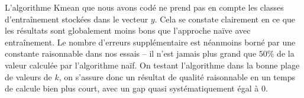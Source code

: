 \documentclass{article}
\begin{document}
L'algorithme Kmean que nous avons codé ne prend pas en compte les classes d'entraînement stockées dans le vecteur $y$. Cela se constate clairement en ce que les résultats sont globalement moins bons que l'approche naïve avec entraînement. Le nombre d'erreurs supplémentaire est néanmoins borné par une constante raisonnable dans nos essais -- il n'est jamais plus grand que $50\%$ de la valeur calculée par l'algorithme naïf. On testant l'algorithme dans la bonne plage de valeurs de $k$, on s'assure donc un résultat de qualité raisonnable en un temps de calcule bien plus court, avec un gap quasi systématiquement égal à 0.
\end{document}
